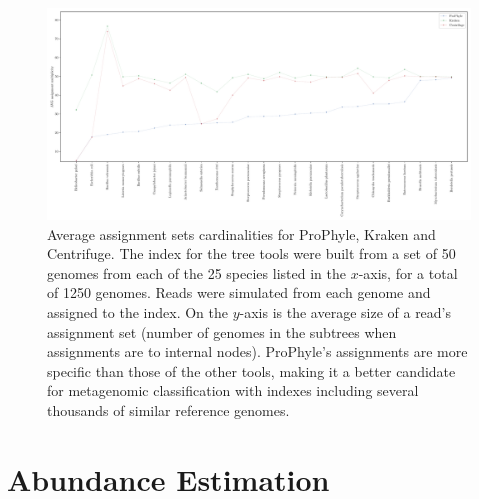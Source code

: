 \begin{figure}
  \caption{Average assignment sets cardinalities for ProPhyle, Kraken and Centrifuge. The index for the tree tools were built from a set of 50 genomes from each of the 25 species listed in the $x$-axis, for a total of 1250 genomes. Reads were simulated from each genome and assigned to the index. On the $y$-axis is the average size of a read's assignment set (number of genomes in the subtrees when assignments are to internal nodes). ProPhyle's assignments are more specific than those of the other tools, making it a better candidate for metagenomic classification with indexes including several thousands of similar reference genomes.}
  \centering
    \includegraphics[width=1\textwidth]{Figures/mult_ass.pdf}
\end{figure}

\section{Abundance Estimation}


